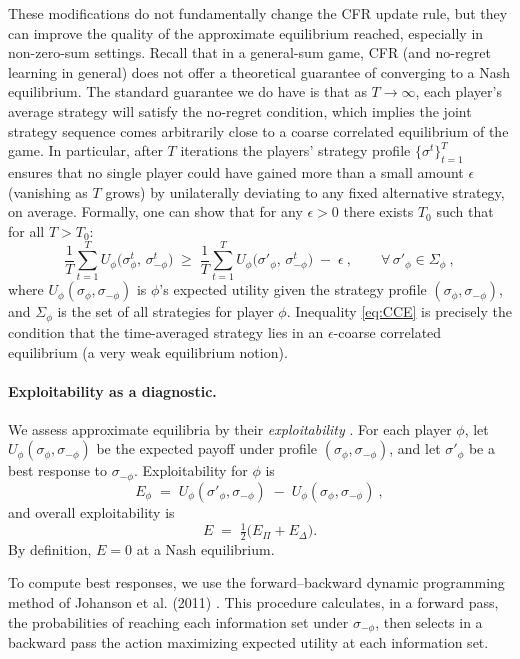 \documentclass{article}
\begin{document}
These modifications do not fundamentally change the CFR update rule, but they can improve the quality of the approximate equilibrium reached, especially in non-zero-sum settings. Recall that in a general-sum game, CFR (and no-regret learning in general) does not offer a theoretical guarantee of converging to a Nash equilibrium. The standard guarantee we do have is that as $T\to\infty$, each player’s average strategy will satisfy the no-regret condition, which implies the joint strategy sequence comes arbitrarily close to a coarse correlated equilibrium of the game. In particular, after $T$ iterations the players’ strategy profile $\{\sigma^t\}_{t=1}^T$ ensures that no single player could have gained more than a small amount $\epsilon$ (vanishing as $T$ grows) by unilaterally deviating to any fixed alternative strategy, on average. Formally, one can show that for any $\epsilon>0$ there exists $T_0$ such that for all $T>T_0$: 
\begin{equation}\label{eq:CCE}
\frac{1}{T}\sum_{t=1}^T U_\phi\!\big(\sigma^t_{\phi},\,\sigma^t_{-\phi}\big)\;\ge\;\frac{1}{T}\sum_{t=1}^T U_\phi\!\big(\sigma'_{\phi},\,\sigma^t_{-\phi}\big)\;-\;\epsilon~,\qquad \forall\, \sigma'_{\phi}\in\Sigma_\phi~,
\end{equation}
where $U_\phi(\sigma_\phi,\sigma_{-\phi})$ is $\phi$’s expected utility given the strategy profile $(\sigma_\phi,\sigma_{-\phi})$, and $\Sigma_\phi$ is the set of all strategies for player $\phi$. Inequality \eqref{eq:CCE} is precisely the condition that the time-averaged strategy lies in an $\epsilon$-coarse correlated equilibrium (a very weak equilibrium notion). 
\paragraph{Exploitability as a diagnostic.} 
We assess approximate equilibria by their \emph{exploitability} 
\cite{lanctot}. For each player $\phi$, let 
$U_\phi(\sigma_\phi,\sigma_{-\phi})$ be the expected payoff under profile 
$(\sigma_\phi,\sigma_{-\phi})$, and let $\sigma'_\phi$ be a best response to 
$\sigma_{-\phi}$. Exploitability for $\phi$ is
\[
E_\phi \;=\; U_\phi(\sigma'_\phi,\sigma_{-\phi}) \;-\; 
             U_\phi(\sigma_\phi,\sigma_{-\phi})~,
\]
and overall exploitability is 
\[
E \;=\; \tfrac{1}{2}\big(E_{\Pi}+E_{\Delta}\big).
\]
By definition, $E=0$ at a Nash equilibrium. 

To compute best responses, we use the forward–backward dynamic programming 
method of Johanson et al. (2011) \cite{johanson}. This procedure calculates, in a forward pass, 
the probabilities of reaching each information set under $\sigma_{-\phi}$, then 
selects in a backward pass the action maximizing expected utility at each 
information set. 
\end{document}
